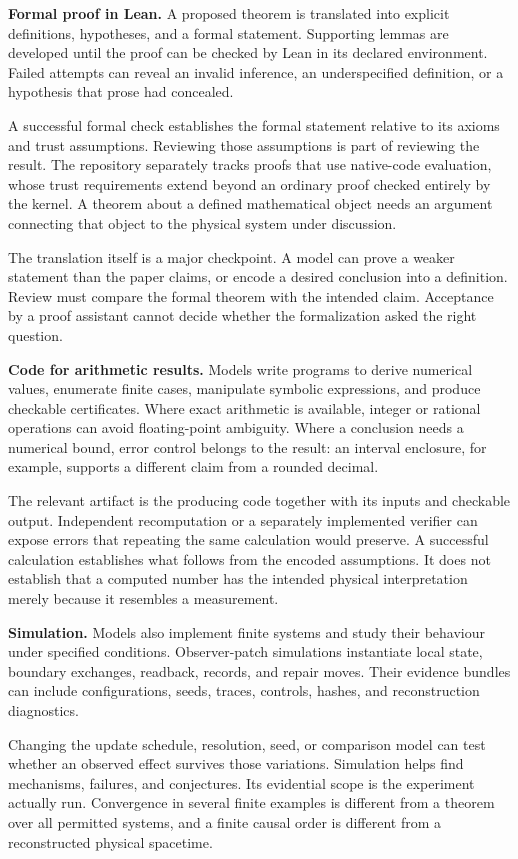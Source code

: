 \documentclass[
  11pt,
]{article}
\begin{document}
\textbf{Formal proof in Lean.} A proposed theorem is translated into
explicit definitions, hypotheses, and a formal statement. Supporting
lemmas are developed until the proof can be checked by Lean in its
declared environment. Failed attempts can reveal an invalid inference,
an underspecified definition, or a hypothesis that prose had concealed.

A successful formal check establishes the formal statement relative to
its axioms and trust assumptions. Reviewing those assumptions is part of
reviewing the result. The repository separately tracks proofs that use
native-code evaluation, whose trust requirements extend beyond an
ordinary proof checked entirely by the kernel. A theorem about a defined
mathematical object needs an argument connecting that object to
the physical system under discussion.

The translation itself is a major checkpoint. A model can prove a weaker
statement than the paper claims, or encode a desired conclusion into a
definition. Review must compare the formal theorem with the intended
claim. Acceptance by a proof assistant cannot decide whether the
formalization asked the right question.

\textbf{Code for arithmetic results.} Models write programs to derive
numerical values, enumerate finite cases, manipulate symbolic
expressions, and produce checkable certificates. Where exact arithmetic
is available, integer or rational operations can avoid floating-point
ambiguity. Where a conclusion needs a numerical bound, error control
belongs to the result: an interval enclosure, for example, supports a
different claim from a rounded decimal.

The relevant artifact is the producing code together with its inputs and
checkable output. Independent recomputation or a separately implemented
verifier can expose errors that repeating the same calculation would
preserve. A successful calculation establishes what follows from the
encoded assumptions. It does not establish that a computed number has
the intended physical interpretation merely because it resembles a
measurement.

\textbf{Simulation.} Models also implement finite systems and study
their behaviour under specified conditions. Observer-patch simulations
instantiate local state, boundary exchanges, readback, records, and
repair moves. Their evidence bundles can include configurations, seeds,
traces, controls, hashes, and reconstruction diagnostics.

Changing the update schedule, resolution, seed, or comparison model can
test whether an observed effect survives those variations. Simulation
helps find mechanisms, failures, and conjectures. Its evidential scope
is the experiment actually run. Convergence in several finite examples
is different from a theorem over all permitted systems, and a finite
causal order is different from a reconstructed physical spacetime.
\end{document}

